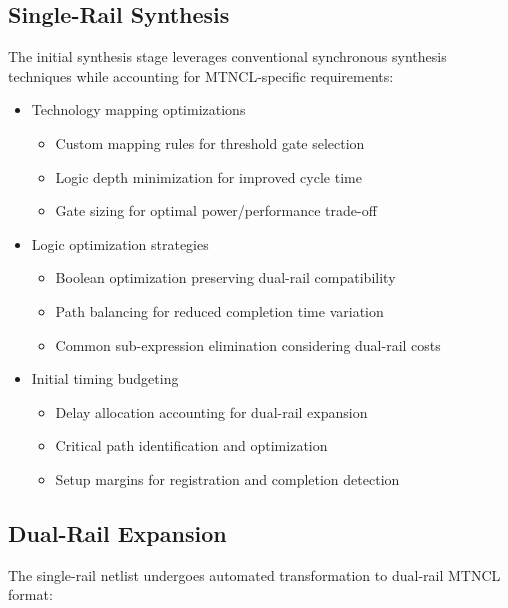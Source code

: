 \documentclass[conference]{IEEEtran}
\begin{document}
\subsection{Single-Rail Synthesis}
The initial synthesis stage leverages conventional synchronous synthesis techniques while accounting for MTNCL-specific requirements:

\begin{itemize}
\item Technology mapping optimizations
  \begin{itemize}
  \item Custom mapping rules for threshold gate selection
  \item Logic depth minimization for improved cycle time
  \item Gate sizing for optimal power/performance trade-off
  \end{itemize}
\item Logic optimization strategies
  \begin{itemize}
  \item Boolean optimization preserving dual-rail compatibility
  \item Path balancing for reduced completion time variation
  \item Common sub-expression elimination considering dual-rail costs
  \end{itemize}
\item Initial timing budgeting
  \begin{itemize}
  \item Delay allocation accounting for dual-rail expansion
  \item Critical path identification and optimization
  \item Setup margins for registration and completion detection
  \end{itemize}
\end{itemize}

\subsection{Dual-Rail Expansion}
The single-rail netlist undergoes automated transformation to dual-rail MTNCL format:
\end{document}
